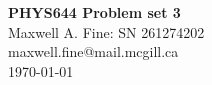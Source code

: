 \documentclass[11pt]{article}
\begin{document}
\begin{center}
    {\Large \textbf{PHYS644 Problem set 3}}\\
    Maxwell A. Fine: SN 261274202 \\ 
    maxwell.fine@mail.mcgill.ca \\
    \today
\end{center}




\end{document}
